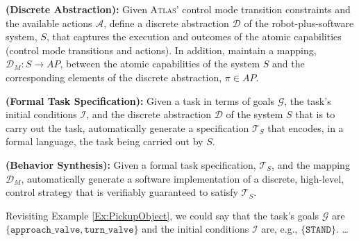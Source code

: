 
\begin{myProblem}\label{DiscreteAbstractionProblem}
\textbf{(Discrete Abstraction):}
Given \textsc{Atlas}' control mode transition constraints and the available actions $\mathcal{A}$, define a discrete abstraction $\mathcal{D}$ of the robot-plus-software system, $S$, that captures the execution and outcomes of the atomic capabilities (control mode transitions and actions).
In addition, maintain a mapping, $\mathcal{D}_M : S \rightarrow AP$, between the atomic capabilities of the system $S$ and the corresponding elements of the discrete abstraction, $\pi \in AP$.
\end{myProblem}

\begin{myProblem}\label{SpecificationProblem}
\textbf{(Formal Task Specification):}
Given a task in terms of goals $\mathcal{G}$, the task's initial conditions $\mathcal{I}$, and the discrete abstraction $\mathcal{D}$ of the system $S$ that is to carry out the task, automatically generate a specification $\mathcal{T}_S$ that encodes, in a formal language, the task being carried out by $S$.
\end{myProblem}

\begin{myProblem}\label{BehaviorSynthesisProblem}
\textbf{(Behavior Synthesis):}
Given a formal task specification, $\mathcal{T}_S$, and the mapping $\mathcal{D}_M$, automatically generate a software implementation of a discrete, high-level, control strategy that is verifiably guaranteed to satisfy $\mathcal{T}_S$.
\end{myProblem}

Revisiting Example \ref{Ex:PickupObject}, we could say that the task's goals $\mathcal{G}$ are $\{ \mathtt{approach\_valve}, \mathtt{turn\_valve} \}$ and the initial conditions $\mathcal{I}$ are, e.g., $\{ \mathtt{STAND} \}$.
\ldots

